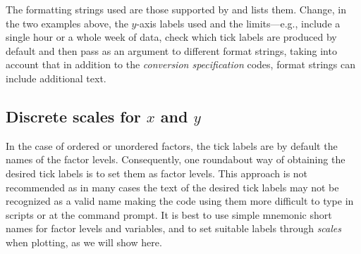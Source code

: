 \documentclass[krantz2]{krantz}\usepackage{knitr}
\begin{document}
\begin{knitrout}\footnotesize
{}\color{fgcolor}
\end{knitrout}

\begin{playground}
The formatting strings used are those supported by  and  lists them. Change, in the two examples above, the $y$-axis labels used and the limits---e.g., include a single hour or a whole week of data, check which tick labels are produced by default and then pass as an argument to  different format strings, taking into account that in addition to the \emph{conversion specification} codes, format strings can include additional text.
\end{playground}

\subsection{Discrete scales for $x$ and $y$}

In the case of ordered or unordered factors, the tick labels are by default the names of the factor levels. Consequently, one roundabout way of obtaining the desired tick labels is to set them as factor levels. This approach is not recommended as in many cases the text of the desired tick labels may not be recognized as a valid name making the code using them more difficult to type in scripts or at the command prompt. It is best to use simple mnemonic short names for factor levels and variables, and to set suitable labels through \emph{scales} when plotting, as we will show here.
\end{document}
